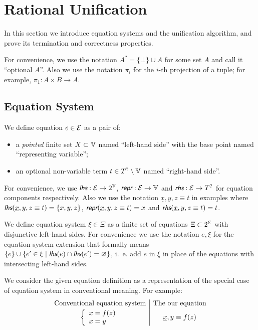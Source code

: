 \section{Rational Unification}

In this section we introduce equation systems and the unification algorithm, and prove its termination and correctness properties.

For convenience, we use the notation $A^? = \{ \bot \} \cup A$ for some set $A$ and call it ``optional $A$''. Also we use the notation $\pi_i$ for the $i$-th projection of a tuple; for example, $\pi_1 : A \times B \rightarrow A$.


\subsection{Equation System}

We define equation $e \in \mathcal{E}$ as a pair of:
\begin{itemize}
    \item a \textit{pointed} finite set $X \subset \mathbb{V}$ named ``left-hand side'' with the base point named ``representing variable'';
    \item an optional non-variable term $t \in T^? \setminus \mathbb{V}$ named ``right-hand side''.
\end{itemize}

For convenience, we use $\lhs : \E \rightarrow 2^\V$, $\repr : \E \rightarrow \V$ and $\rhs : \E \rightarrow T^?$ for equation components respectively. Also we use the notation $\underline{x}, y, z \equiv t$ in examples where $\lhs(\underline{x}, y, z \equiv t) = \{ x, y, z \}$, $\repr(\underline{x}, y, z \equiv t) = x$ and $\rhs(\underline{x}, y, z \equiv t) = t$.

We define equation system $\xi \in \Xi$ as a finite set of equations $\Xi \subset 2^{\mathcal{E}}$ with disjunctive left-hand sides. For convenience we use the notation $e, \xi$ for the equation system extension that formally means $\{ e \} \cup \{ e' \in \xi \mid \lhs(e) \cap \lhs(e') = \emptyset \}$, i.~e. add $e$ in $\xi$ in place of the equations with intersecting left-hand sides.

We consider the given equation definition as a representation of the special case of equation system in conventional meaning. For example:
\begin{equation*}
    \begin{array}{c|c}
        \text{Conventional equation system} & \text{The our equation} \\[2pt]
        \left\{
        \begin{array}{l@{{}={}}l}
            x & f(z) \\
            x & y \\
        \end{array}
        \right. &
        \underline{x}, y \equiv f(z) \\
    \end{array}
\end{equation*}

